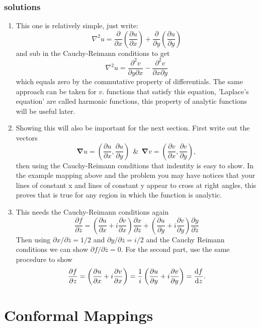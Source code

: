 \subsubsection{solutions}
\begin{enumerate}
	\item This one is relatively simple, just write:
	\begin{equation*}
	\nabla^2u=\frac{\partial}{\partial x}\left(\frac{\partial u}{\partial x}\right)+\frac{\partial}{\partial y}\left(\frac{\partial u}{\partial y}\right)
	\end{equation*}
	and sub in the Cauchy-Reimann conditions to get
	\begin{equation*}
	\nabla^2u=\frac{\partial^2v}{\partial y \partial x}-\frac{\partial^2v}{\partial x \partial y}
	\end{equation*}
	which equals zero by the commutative property of differentials. The same approach can be taken for $v$. functions that satisfy this equation, 'Laplace's equation' are called harmonic functions, this property of analytic functions will be useful later.
	\item Showing this will also be important for the next section. First write out the vectors
	\begin{equation*}
	\pmb{\nabla}u=\left(\frac{\partial u}{\partial x},\frac{\partial u}{\partial y}\right)~~\&~~\pmb{\nabla}v=\left(\frac{\partial v}{\partial x},\frac{\partial v}{\partial y}\right),
	\end{equation*}
	then using the Cauchy-Reimann conditions that indentity is easy to show.	
	 In the example mapping above and the problem you may have notices that your lines of constant x and lines of constant y appear to cross at right angles, this proves that is true for any region in which the function is analytic.
	\item This needs the Cauchy-Reimann conditions again
	$$\frac{\partial f}{\partial \overline{z}}=\left(\frac{\partial u}{\partial x}+i\frac{\partial v}{\partial x}\right)\frac{\partial x}{\partial \overline{z}}+\left(\frac{\partial u}{\partial y}+i\frac{\partial v}{\partial y}\right)\frac{\partial y}{\partial \overline{z}}     $$
	Then using $\partial x/\partial \overline{z}=1/2$ and $\partial y/\partial \overline{z}=i/2$ and the Cauchy Reimann conditions we can show $\partial f/\partial \overline{z}=0$. For the second part, use the same procedure to show
	\begin{equation*}
	\frac{\partial f}{\partial z}=\left(\frac{\partial u}{\partial x} + i \frac{\partial v}{\partial x}\right)=\frac{1}{i}\left(\frac{\partial u}{\partial y} + i \frac{\partial v}{\partial y}\right)=\frac{\mathop{}\!\mathrm{d} f}{\mathop{}\!\mathrm{d} z}.
	\end{equation*}
\end{enumerate}
%
%
\section{Conformal Mappings}
 